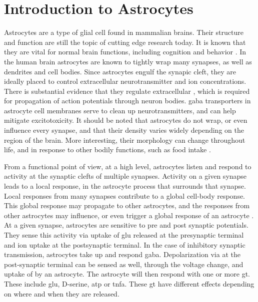     \section{Introduction to Astrocytes}
    Astrocytes are a type of glial cell found in mammalian brains. Their
    structure and function are still the topic of cutting edge research
    today. It is known that they are vital for normal brain functions, including
    cognition and behavior \parencite{mederos_2018}. In the human brain astrocytes
    are known to tightly wrap many synapses, as well as dendrites and cell
    bodies. Since astrocytes engulf the synapic cleft, they are ideally
    placed to control extracellular neurotransmitter and ion
    concentrations. There is substantial evidence that they regulate
    extracellular \kp, which is required for propagation of action potentials
    through neuron bodies. \Gls{gaba} transporters in astrocyte cell membranes
    serve to clean up neurotransmitters, and can help mitigate excitotoxicity. It
    should be noted that astrocytes do not wrap, or even influence every
    synapse, and that their density varies widely depending on the region of the
    brain. More interesting, their morphology can change throughout life, and in
    response to other bodily functions, such as food intake \parencite{mederos_2018}.

    From a functional point of view, at a high level, astrocytes listen and
    respond to activity at the synaptic clefts of multiple synapses. Activity on
    a given synapse leads to a local response, in the astrocyte process that
    surrounds that synapse. Local responses from many synapses contribute to a
    global cell-body response. This global response may propagate to other
    astrocytes, and the responses from other astrocytes may influence, or even
    trigger a global response of an astrocyte \parencite{min_2012}. At a given
    synapse, astrocytes are sensitive to pre and post synaptic potentials. They
    sense this activity via uptake of \gls{glu} released at the presynaptic
    terminal and \kp ion uptake at the postsynaptic terminal. In the case
    of inhibitory synaptic transmission, astrocytes take up and respond
    \gls{gaba}. Depolarization via \kp at the post-synaptic terminal can be
    sensed as well, through the voltage change, and uptake of \kp by an
    astrocyte. The astrocyte will then respond with one or more
    \gls{gt}. These include \gls{glu}, D-serine, \gls{atp} or
    \gls{tnfa}. These \gls{gt} have different effects depending on where
    and when they are released.

